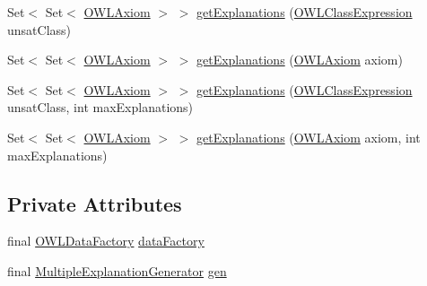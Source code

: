 \begin{DoxyCompactItemize}
\item 
Set$<$ Set$<$ \hyperlink{interfaceorg_1_1semanticweb_1_1owlapi_1_1model_1_1_o_w_l_axiom}{O\-W\-L\-Axiom} $>$ $>$ \hyperlink{classcom_1_1clarkparsia_1_1owlapi_1_1explanation_1_1_default_explanation_generator_a8ed0439f59203fe32756bc887a197956}{get\-Explanations} (\hyperlink{interfaceorg_1_1semanticweb_1_1owlapi_1_1model_1_1_o_w_l_class_expression}{O\-W\-L\-Class\-Expression} unsat\-Class)
\item 
Set$<$ Set$<$ \hyperlink{interfaceorg_1_1semanticweb_1_1owlapi_1_1model_1_1_o_w_l_axiom}{O\-W\-L\-Axiom} $>$ $>$ \hyperlink{classcom_1_1clarkparsia_1_1owlapi_1_1explanation_1_1_default_explanation_generator_a758bfd6daefc7ebb3f817570c1a0dd6f}{get\-Explanations} (\hyperlink{interfaceorg_1_1semanticweb_1_1owlapi_1_1model_1_1_o_w_l_axiom}{O\-W\-L\-Axiom} axiom)
\item 
Set$<$ Set$<$ \hyperlink{interfaceorg_1_1semanticweb_1_1owlapi_1_1model_1_1_o_w_l_axiom}{O\-W\-L\-Axiom} $>$ $>$ \hyperlink{classcom_1_1clarkparsia_1_1owlapi_1_1explanation_1_1_default_explanation_generator_aaf5274e22becdb2b7beb859f2b6656e0}{get\-Explanations} (\hyperlink{interfaceorg_1_1semanticweb_1_1owlapi_1_1model_1_1_o_w_l_class_expression}{O\-W\-L\-Class\-Expression} unsat\-Class, int max\-Explanations)
\item 
Set$<$ Set$<$ \hyperlink{interfaceorg_1_1semanticweb_1_1owlapi_1_1model_1_1_o_w_l_axiom}{O\-W\-L\-Axiom} $>$ $>$ \hyperlink{classcom_1_1clarkparsia_1_1owlapi_1_1explanation_1_1_default_explanation_generator_ac27624753b848ebe390ebdf860d8d720}{get\-Explanations} (\hyperlink{interfaceorg_1_1semanticweb_1_1owlapi_1_1model_1_1_o_w_l_axiom}{O\-W\-L\-Axiom} axiom, int max\-Explanations)
\end{DoxyCompactItemize}
\subsection*{Private Attributes}
\begin{DoxyCompactItemize}
\item 
final \hyperlink{interfaceorg_1_1semanticweb_1_1owlapi_1_1model_1_1_o_w_l_data_factory}{O\-W\-L\-Data\-Factory} \hyperlink{classcom_1_1clarkparsia_1_1owlapi_1_1explanation_1_1_default_explanation_generator_ac1ca03bbacd6a3f8b4311f4395427269}{data\-Factory}
\item 
final \hyperlink{interfacecom_1_1clarkparsia_1_1owlapi_1_1explanation_1_1_multiple_explanation_generator}{Multiple\-Explanation\-Generator} \hyperlink{classcom_1_1clarkparsia_1_1owlapi_1_1explanation_1_1_default_explanation_generator_a1a8e2c3938849567ca8e349f9fc8f2cc}{gen}
\end{DoxyCompactItemize}



